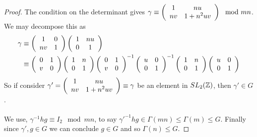 \begin{proof}
The condition on the determinant gives $\gamma \equiv  \left(\begin{array}{ c c } 1 & nu \\ nv & 1 + n^2uv \end{array} \right) \mod mn$.
We may decompose this as 
\begin{align*}
\gamma &\equiv  \left(\begin{array}{ c c } 1 & 0 \\ nv & 1 \end{array} \right) \left(\begin{array}{ c c } 1 & nu \\ 0 & 1 \end{array} \right) \\
&\equiv \left(\begin{array}{ c c } 0 & 1 \\ v & 0 \end{array} \right) \left(\begin{array}{ c c } 1 & n \\ 0 & 1 \end{array} \right) {\left(\begin{array}{ c c } 0 & 1 \\ v & 0 \end{array} \right)}^{-1} \left(\begin{array}{ c c } u & 0 \\ 0 & 1 \end{array} \right)^{-1}\left(\begin{array}{ c c } 1 & n \\ 0 & 1 \end{array} \right) \left(\begin{array}{ c c } u & 0 \\ 0 & 1 \end{array} \right)
\end{align*}
So if consider $\gamma' =  \left(\begin{array}{ c c } 1 & nu \\ nv & 1 + n^2uv \end{array} \right) \equiv \gamma$ be an element in $SL_2(\mathbb{Z})$, then $\gamma' \in G$.\\
\\
We use, $\gamma^{-1}hg \equiv I_2 \mod mn$, to say $\gamma'^{-1}hg \in \Gamma(mn) \leq \Gamma(m) \leq G$. Finally since $\gamma',g \in G$ we can conclude $g \in G$ and so $\Gamma(n) \leq G$.
\end{proof}

